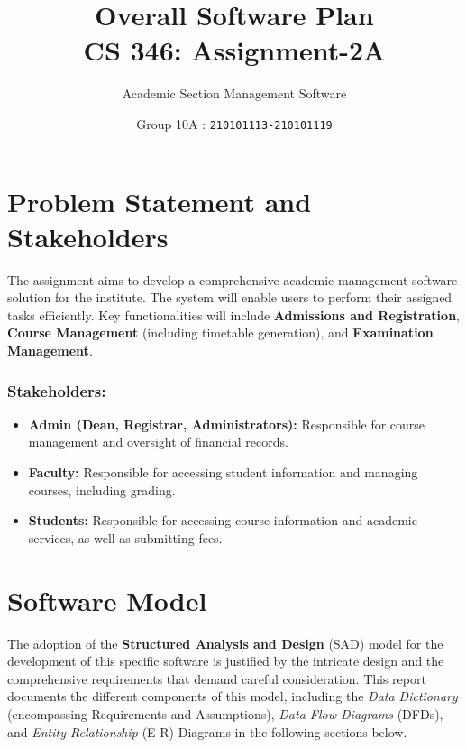 \documentclass[12pt,a4paper]{article}
\begin{document}
\title{\huge \textbf{Overall Software Plan} \\ \LARGE {\textbf{CS 346: Assignment-2A}}}
\author{\Large Academic Section Management Software}
\date{Group 10A : \texttt{210101113-210101119}}
\maketitle


\section{Problem Statement and Stakeholders}
The assignment aims to develop a comprehensive academic management software solution for the institute. The system will enable users to perform their assigned tasks efficiently. Key functionalities will include \textbf{Admissions and Registration}, \textbf{Course Management} (including timetable generation), and \textbf{Examination Management}.

\subsubsection*{Stakeholders:}
\begin{itemize}
    \item \textbf{Admin (Dean, Registrar, Administrators):} Responsible for course management and oversight of financial records.
    \item \textbf{Faculty:} Responsible for accessing student information and managing courses, including grading.
    \item \textbf{Students:} Responsible for accessing course information and academic services, as well as submitting fees.
\end{itemize}

\section{Software Model}
The adoption of the \textbf{Structured Analysis and Design} (SAD) model for the development of this specific software is justified by the intricate design and the comprehensive requirements that demand careful consideration. This report documents the different components of this model, including the \textit{Data Dictionary} (encompassing Requirements and Assumptions), \textit{Data Flow Diagrams} (DFDs), and \textit{Entity-Relationship} (E-R) Diagrams in the following sections below.
    
\end{document}
